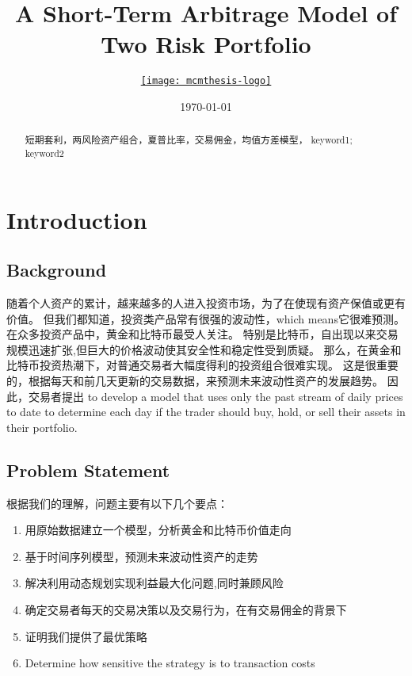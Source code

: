 \documentclass{mcmthesis}
\title{A Short-Term Arbitrage Model of Two Risk Portfolio}
\author{\small \href{https://www.latexstudio.net/}
  {\texttt{[image: mcmthesis-logo]}}}
\date{\today}
\begin{document}
\begin{abstract}


\begin{keywords}
短期套利，两风险资产组合，夏普比率，交易佣金，均值方差模型，
keyword1; keyword2


\end{keywords}
\end{abstract}
\maketitle

\newpage
\thispagestyle{empty}
\tableofcontents
\newpage


\section{Introduction}
\subsection{Background}
随着个人资产的累计，越来越多的人进入投资市场，为了在使现有资产保值或更有价值。
但我们都知道，投资类产品常有很强的波动性，which means它很难预测。
在众多投资产品中，黄金和比特币最受人关注。
特别是比特币，自出现以来交易规模迅速扩张,但巨大的价格波动使其安全性和稳定性受到质疑。
那么，在黄金和比特币投资热潮下，对普通交易者大幅度得利的投资组合很难实现。
这是很重要的，根据每天和前几天更新的交易数据，来预测未来波动性资产的发展趋势。
因此，交易者提出 to develop a model that uses only the past stream of daily prices 
to date to determine each day if the trader should buy, hold, or sell their assets in their portfolio.


\subsection{Problem Statement}
根据我们的理解，问题主要有以下几个要点：
\begin{enumerate}    %
  \item 用原始数据建立一个模型，分析黄金和比特币价值走向
  \item 基于时间序列模型，预测未来波动性资产的走势
  \item 解决利用动态规划实现利益最大化问题,同时兼顾风险
  \item 确定交易者每天的交易决策以及交易行为，在有交易佣金的背景下
  \item 证明我们提供了最优策略
  \item Determine how sensitive the strategy is to transaction costs
\end{enumerate}
\end{document}

